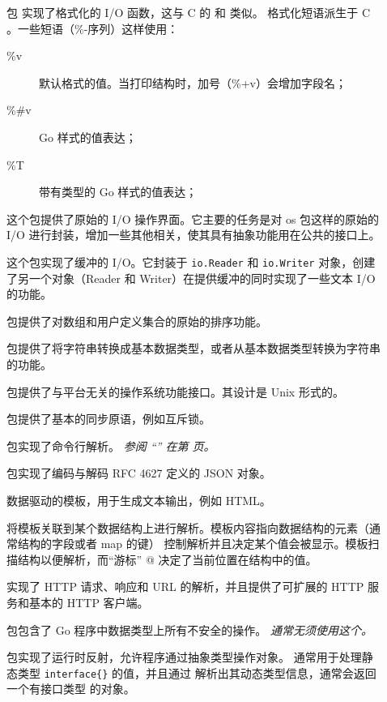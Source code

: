 \begin{description}
\item[]{
包  实现了格式化的 I/O 函数，这与 C 的  和  类似。
格式化短语派生于 C 。一些短语（\%-序列）这样使用：

\begin{description}
\item[\%v]{默认格式的值。当打印结构时，加号（\%+v）会增加字段名；}
\item[\%\#v]{Go 样式的值表达；}
\item[\%T]{带有类型的 Go 样式的值表达；}
\end{description}

}

\item[]{
这个包提供了原始的 I/O 操作界面。它主要的任务是对 os 包这样的原始的 I/O 
进行封装，增加一些其他相关，使其具有抽象功能用在公共的接口上。
}
\item[]{
这个包实现了缓冲的 I/O。它封装于
\lstinline{io.Reader}
和
\lstinline{io.Writer}
对象，创建了另一个对象（Reader 和 Writer）在提供缓冲的同时实现了一些文本 I/O 的功能。
}
\item[]{
 包提供了对数组和用户定义集合的原始的排序功能。
}
\item[]{
 包提供了将字符串转换成基本数据类型，或者从基本数据类型转换为字符串的功能。
}
\item[]{
 包提供了与平台无关的操作系统功能接口。其设计是 Unix 形式的。
}
\item[]{
 包提供了基本的同步原语，例如互斥锁。
}
\item[]{
 包实现了命令行解析。
\emph{参阅 ``'' 在第 \pageref{sec:option parsing} 页。}
}
\item[]{
 包实现了编码与解码 RFC 4627 \cite{RFC4627} 定义的 JSON 对象。
}
\item[]{
数据驱动的模板，用于生成文本输出，例如 HTML。

将模板关联到某个数据结构上进行解析。模板内容指向数据结构的元素（通常结构的字段或者 map 的键）
控制解析并且决定某个值会被显示。模板扫描结构以便解析，而``游标'' @ 决定了当前位置在结构中的值。
}
\item[]{
 实现了 HTTP 请求、响应和 URL 的解析，并且提供了可扩展的 HTTP 服务和基本的 HTTP 客户端。
}
\item[]{
 包包含了 Go 程序中数据类型上所有不安全的操作。
\emph{通常无须使用这个。}
}
\item[]{
 包实现了运行时反射，允许程序通过抽象类型操作对象。
通常用于处理静态类型 \lstinline|interface{}| 的值，并且通过 
解析出其动态类型信息，通常会返回一个有接口类型  的对象。

}
\end{description}
